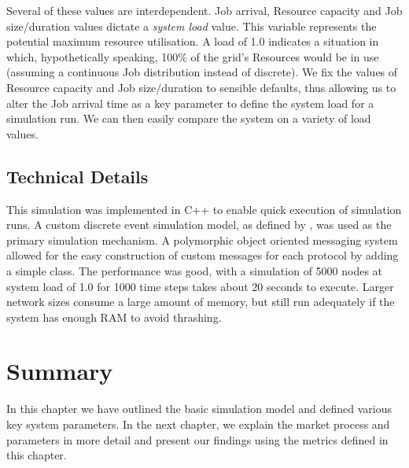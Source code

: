 Several of these values are interdependent. Job arrival, Resource capacity and
Job size/duration values dictate a \textit{system load} value.  This variable
represents the potential maximum resource utilisation. A load of 1.0 indicates
a situation in which, hypothetically speaking, 100\% of the grid's Resources
would be in use (assuming a continuous Job distribution instead of discrete).
We fix the values of Resource capacity and Job size/duration to sensible
defaults, thus allowing us to alter the Job arrival time as a key parameter to
define the system load for a simulation run. We can then easily compare the
system on a variety of load values.


\subsection{Technical Details}

This simulation was implemented in C++ to enable quick execution of simulation
runs. A custom discrete event simulation model, as defined by
\cite{misc-law00-simulation}, was used as the primary simulation mechanism. A
polymorphic object oriented messaging system allowed for the easy construction
of custom messages for each protocol by adding a simple class. The performance
was good, with a simulation of 5000 nodes at system load of 1.0 for 1000 time
steps takes about 20 seconds to execute. Larger network sizes consume a large
amount of memory, but still run adequately if the system has enough RAM to
avoid thrashing.


\section{Summary}

In this chapter we have outlined the basic simulation model and defined various
key system parameters. In the next chapter, we explain the market process
and parameters in more detail and present our findings using the metrics
defined in this chapter.
